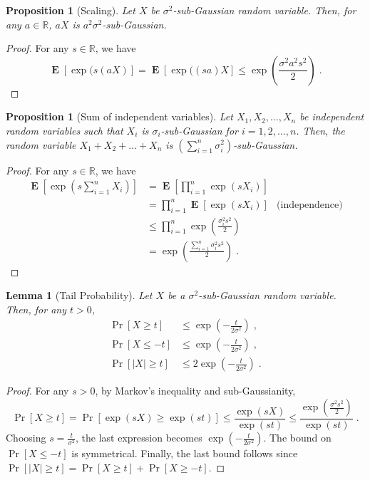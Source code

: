 \documentclass[12pt]{article}
\newtheorem{proposition}[definition]{Proposition}
\newtheorem{lemma}[definition]{Lemma}
\newcommand{\R}{\mathbb{R}}
\DeclareMathOperator*{\Exp}{\mathbf{E}}
\begin{document}
\begin{proposition}[Scaling]
Let $X$ be $\sigma^2$-sub-Gaussian random variable.
Then, for any $a \in \R$, $aX$ is $a^2\sigma^2$-sub-Gaussian.
\end{proposition}

\begin{proof}
For any $s \in \R$, we have
$$
\Exp[\exp(s(aX)] = \Exp[\exp((sa) X] \le \exp\left( \frac{\sigma^2 a^2 s^2}{2} \right) \; .
$$
\end{proof}

\begin{proposition}[Sum of independent variables]
Let $X_1, X_2, \dots, X_n$ be independent random variables
such that $X_i$ is $\sigma_i$-sub-Gaussian for $i=1,2,\dots,n$.
Then, the random variable
$X_1 + X_2 + \dots + X_n$ is $\left(\sum_{i=1}^n \sigma_i^2\right)$-sub-Gaussian.
\end{proposition}

\begin{proof}
For any $s \in \R$, we have
\begin{align*}
\Exp\left[\exp\left(s \sum_{i=1}^n X_i \right)\right]
& = \Exp \left[\prod_{i=1}^n \exp\left(s X_i \right) \right] \\
& = \prod_{i=1}^n \Exp[\exp\left(s X_i \right)] & \text{(independence)} \\
& \le \prod_{i=1}^n \exp\left( \frac{\sigma_i^2 s^2}{2} \right) \\
& = \exp\left( \frac{\sum_{i=1}^n \sigma_i^2 s^2}{2} \right) \; .
\end{align*}
\end{proof}

\begin{lemma}[Tail Probability]
\label{lemma:tail-probability}
Let $X$ be a $\sigma^2$-sub-Gaussian random variable. Then, for any $t > 0$,
\begin{align*}
\Pr[X \ge t] & \le \exp\left( - \frac{t}{2 \sigma^2} \right) \; , \\
\Pr[X \le -t] & \le \exp\left( - \frac{t}{2 \sigma^2} \right) \; , \\
\Pr[|X| \ge t] & \le 2\exp\left( - \frac{t}{2 \sigma^2} \right) \; .
\end{align*}
\end{lemma}

\begin{proof}
For any $s > 0$, by Markov's inequality and sub-Gaussianity,
$$
\Pr[X \ge t]
= \Pr\left[ \exp(sX) \ge \exp(st) \right]
\le \frac{\exp(sX)}{\exp(st)}
\le \frac{\exp(\frac{\sigma^2 s^2}{2})}{\exp(st)} \; .
$$
Choosing $s = \frac{t}{\sigma^2}$, the last expression becomes
$\exp\left(-\frac{t}{2 \sigma^2}\right)$. The bound on $\Pr[X \le -t]$ is
symmetrical. Finally, the last bound follows since $\Pr[|X| \ge t] = \Pr[X \ge t] +
\Pr[X \ge - t]$.
\end{proof}
\end{document}

